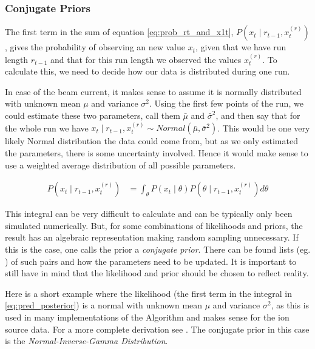 \documentclass[12pt,a4paper]{article}
\begin{document}
\subsubsection{Conjugate Priors}\label{sec:conjugate_priors}
The first term in the sum of equation \eqref{eq:prob_rt_and_x1t}, $P(x_t \mid r_{t-1}, x_t^{(r)})$, gives the probability of observing an new value $x_t$, given that we have run length $r_{t-1}$ and that for this run length we observed the values $x_t^{(r)}$. To calculate this, we need to decide how our data is distributed during one run. 

In case of the beam current, it makes sense to assume it is normally distributed with unknown mean $\mu$ and variance $\sigma^2$. Using the first few points of the run, we could estimate these two parameters, call them $\bar\mu$ and $\bar\sigma^2$, and then say that for the whole run we have $x_t \mid r_{t-1}, x_t^{(r)} \sim Normal(\bar\mu, \bar\sigma^2)$. This would be one very likely Normal distribution the data could come from, but as we only estimated the parameters, there is some uncertainty involved. Hence it would make sense to use a weighted average distribution of all possible parameters.

\begin{equation}\label{eq:pred_posterior}
\begin{aligned}
	P(x_t \mid r_{t-1}, x_t^{(r)}) &= \int_\theta P(x_t \mid \theta) P(\theta \mid r_{t-1}, x_t^{(r)}) d\theta
\end{aligned}
\end{equation}

This integral can be very difficult to calculate and can be typically only been simulated numerically. But, for some combinations of likelihoods and priors, the result has an algebraic representation making random sampling unnecessary. If this is the case, one calls the prior a \textit{conjugate prior}. There can be found lists (eg. \cite{Fink:CompendiumConjugatePriors}) of such pairs and how the parameters need to be updated. It is important to still have in mind that the likelihood and prior should be chosen to reflect reality.

Here is a short example where the likelihood (the first term in the integral in \eqref{eq:pred_posterior}) is a normal with unknown mean $\mu$ and variance $\sigma^2$, as this is used in many implementations of the Algorithm and makes sense for the ion source data. For a more complete derivation see \cite{Murphy:ConjugateBayesiananalysis}. The conjugate prior in this case is the \textit{Normal-Inverse-Gamma Distribution}.
\end{document}
